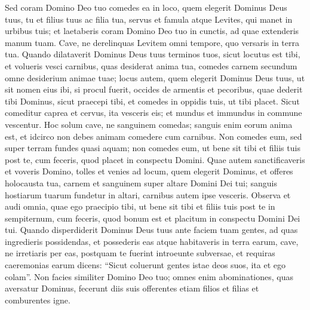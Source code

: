 \begin{biblechapter}
\begin{biblechapter}
\begin{biblechapter}
\begin{biblechapter}
\begin{biblechapter}
\begin{biblechapter}
\begin{biblechapter}
\begin{biblechapter}
\begin{biblechapter}
\begin{biblechapter}
\begin{biblechapter}
\begin{biblechapter}
\verse Sed coram Domino Deo tuo comedes ea in loco, quem elegerit Dominus Deus tuus, tu et filius tuus ac filia tua, servus et famula atque Levites, qui manet in urbibus tuis; et laetaberis coram Domino Deo tuo in cunctis, ad quae extenderis manum tuam. 
 \verse Cave, ne derelinquas Levitem omni tempore, quo versaris in terra tua.
 \verse Quando dilataverit Dominus Deus tuus terminos tuos, sicut locutus est tibi, et volueris vesci carnibus, quas desiderat anima tua, comedes carnem secundum omne desiderium animae tuae; 
\verse locus autem, quem elegerit Dominus Deus tuus, ut sit nomen eius ibi, si procul fuerit, occides de armentis et pecoribus, quae dederit tibi Dominus, sicut praecepi tibi, et comedes in oppidis tuis, ut tibi placet. 
\verse Sicut comeditur caprea et cervus, ita vesceris eis; et mundus et immundus in commune vescentur. 
\verse Hoc solum cave, ne sanguinem comedas; sanguis enim eorum anima est, et idcirco non debes animam comedere cum carnibus. 
\verse Non comedes eum, sed super terram fundes quasi aquam; 
\verse non comedes eum, ut bene sit tibi et filiis tuis post te, cum feceris, quod placet in conspectu Domini. 
\verse Quae autem sanctificaveris et voveris Domino, tolles et venies ad locum, quem elegerit Dominus, 
\verse et offeres holocausta tua, carnem et sanguinem super altare Domini Dei tui; sanguis hostiarum tuarum fundetur in altari, carnibus autem ipse vesceris.
 \verse Observa et audi omnia, quae ego praecipio tibi, ut bene sit tibi et filiis tuis post te in sempiternum, cum feceris, quod bonum est et placitum in conspectu Domini Dei tui.
 \verse Quando disperdiderit Dominus Deus tuus ante faciem tuam gentes, ad quas ingredieris possidendas, et possederis eas atque habitaveris in terra earum, 
 \verse cave, ne irretiaris per eas, postquam te fuerint introeunte subversae, et requiras caeremonias earum dicens: “Sicut coluerunt gentes istae deos suos, ita et ego colam”. 
\verse Non facies similiter Domino Deo tuo; omnes enim abominationes, quas aversatur Dominus, fecerunt diis suis offerentes etiam filios et filias et comburentes igne.
 

\end{biblechapter}
\end{biblechapter}
\end{biblechapter}
\end{biblechapter}
\end{biblechapter}
\end{biblechapter}
\end{biblechapter}
\end{biblechapter}
\end{biblechapter}
\end{biblechapter}
\end{biblechapter}
\end{biblechapter}

